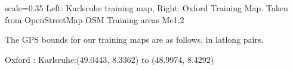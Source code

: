 {scale=0.35}%
{Left: Karlsruhe training map, Right: Oxford Training Map. Taken from OpenStreetMap}%
{OSM Training areas}%
{Me1.2}

The GPS bounds for our training maps are as follows, in latlong pairs. 

Oxford : 
Karlsruhe:(49.0443, 8.3362) to (48.9974, 8.4292)




















